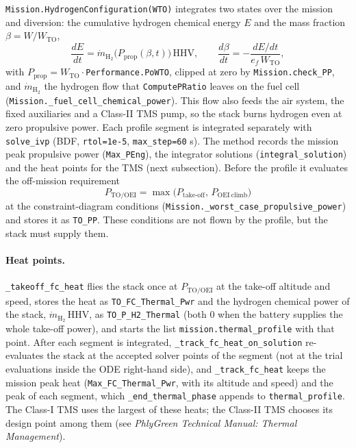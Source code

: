 \documentclass[a4paper,11pt]{article}
\newcommand{\code}[1]{\nolinkurl{#1}}
\newcommand{\fn}[1]{\nolinkurl{#1}}
\begin{document}
\fn{Mission.HydrogenConfiguration(WTO)} integrates two states over the mission and diversion:
the cumulative hydrogen chemical energy $E$ and the mass fraction $\beta=W/W_\mathrm{TO}$,
\begin{equation}
  \frac{dE}{dt} = \dot m_{\mathrm{H_2}}\big(P_\mathrm{prop}(\beta,t)\big)\,\mathrm{HHV}, \qquad
  \frac{d\beta}{dt} = -\frac{dE/dt}{e_f\,W_\mathrm{TO}} ,
  \label{eq:missionode}
\end{equation}
with $P_\mathrm{prop}=W_\mathrm{TO}\cdot$\fn{Performance.PoWTO}, clipped at zero by
\fn{Mission.check_PP}, and $\dot m_{\mathrm{H_2}}$ the hydrogen flow that \fn{ComputePRatio}
leaves on the fuel cell (\fn{Mission._fuel_cell_chemical_power}). This flow also feeds the
air system, the fixed auxiliaries and a Class-II TMS pump, so the stack burns hydrogen even at
zero propulsive power. Each profile segment is integrated
separately with \code{solve_ivp} (BDF, \code{rtol=1e-5}, \code{max_step=60} s). The method
records the mission peak propulsive power (\code{Max_PEng}), the integrator solutions
(\code{integral_solution}) and the heat points for the TMS (next subsection). Before the
profile it evaluates the off-mission requirement
\begin{equation}
  P_\mathrm{TO/OEI} = \max\big(P_\mathrm{take\text{-}off},\, P_\mathrm{OEI\ climb}\big)
\end{equation}
at the constraint-diagram conditions (\fn{Mission._worst_case_propulsive_power}) and stores it
as \code{TO_PP}. These conditions are not flown by the profile, but the stack must supply them.

\paragraph{Heat points.} \fn{_takeoff_fc_heat} flies the stack once at $P_\mathrm{TO/OEI}$ at the
take-off altitude and speed, stores the heat as \code{TO_FC_Thermal_Pwr} and the hydrogen
chemical power of the stack, $\dot m_{\mathrm{H_2}}\,\mathrm{HHV}$, as \code{TO_P_H2_Thermal}
(both 0 when the battery supplies the whole take-off power), and starts the list
\code{mission.thermal_profile} with that point. After each segment is integrated,
\fn{_track_fc_heat_on_solution} re-evaluates the stack at the accepted solver points of the
segment (not at the trial evaluations inside the ODE right-hand side), and \fn{_track_fc_heat}
keeps the mission peak heat (\code{Max_FC_Thermal_Pwr}, with its altitude
and speed) and the peak of each segment, which \fn{_end_thermal_phase} appends to
\code{thermal_profile}. The Class-I TMS uses the largest of these heats; the Class-II TMS
chooses its design point among them (see \emph{PhlyGreen Technical Manual: Thermal
Management}).
\end{document}
